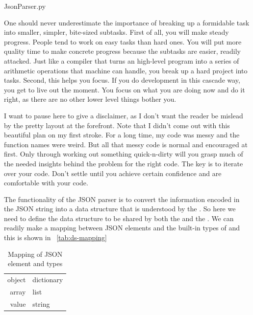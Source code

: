 
{JsonParser.py}

One should never underestimate the importance of breaking up a formidable task into smaller,
simpler, bite-sized subtasks.
First of all, you will make steady progress.
People tend to work on easy tasks than hard ones.
You will put more quality time to make concrete progress because the subtasks are easier, readily
attacked.
Just like a compiler that turns an high-level program into a series of arithmetic
operations that machine can handle, you break up a hard project into tasks.
Second, this helps you focus.
If you do development in this cascade way, you get to live out the moment.
You focus on what you are doing now and do it right, as there are no other lower level things
bother you.

I want to pause here to give a disclaimer, as
I don't want the reader be mislead by the pretty layout at the forefront.
Note that I didn't come out with this beautiful plan on my first stroke.
For a long time, my code was messy and the function names were weird.
But all that messy code is normal and encouraged at first.
Only through working out something quick-n-dirty will you grasp much of the needed insights
behind the problem for the right code.
The key is to iterate over your code.
Don't settle until you achieve certain confidence and are comfortable with your code.

The functionality of the JSON parser is to convert the information encoded in the JSON string
into a data structure that is understood by the .
So here we need to define the data structure to be shared by both the  and the
.
We can readily make a mapping between JSON elements and the built-in types of \python and this is
shown in ~\autoref{tab:ds-mapping}

\begin{table}[h]
    \begin{center}
        \caption{Mapping of JSON element and \python types
        \label{tab:ds-mapping}}
        \begin{tabular}{r|l}
            object & dictionary \\
            array & list \\
            value & string \\
        \end{tabular}
    \end{center}
\end{table}

